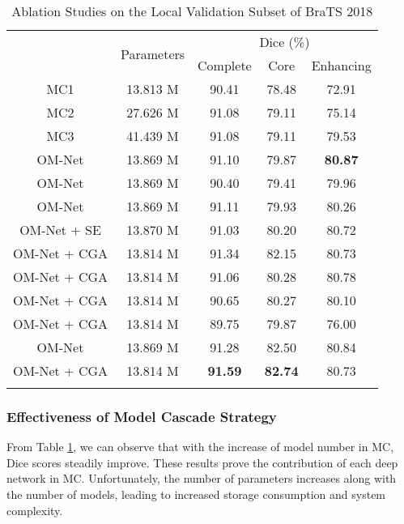 \documentclass[journal,twoside]{IEEEtran}
\begin{document}
\begin{table}[tp]
	\newcommand{\tabincell}[2]{\begin{tabular}{@{}#1@{}}#2\end{tabular}}	
	\fontsize{7}{14}\selectfont
	\centering
	\caption{Ablation Studies on the Local Validation Subset of BraTS 2018 }	
	\label{Table1}
	\begin{tabular}{c|c|c|c|c} 
		\shline
		\multirow{2}{*}{Method} & \multirow{2}{*}{Parameters} & \multicolumn{3}{c}{Dice (\%)} \\
		\cline{3-5}
		&  &Complete &Core &Enhancing  \\
		\hline 		
		MC1 &13.813 M  &90.41 &78.48 &72.91 \\
		\hline
		MC2 &27.626 M  &91.08 &79.11 &75.14 \\
		\hline
		MC3 &41.439 M  &91.08 &79.11 &79.53 \\
		\hline 
		\hline
		OM-Net &13.869 M  &91.10 &79.87 &\textbf{80.87} \\
		\hline		
		OM-Net &13.869 M  &90.40 &79.41 &79.96 \\
		\hline
		OM-Net &13.869 M  &91.11 &79.93 &80.26 \\	
		\hline
		\hline			
		OM-Net + SE & 13.870 M  &91.03 &80.20 &80.72 \\				
		\hline						
		OM-Net + CGA &13.814 M  &91.34 &82.15 &80.73 \\	
		\hline			
		OM-Net + CGA &13.814 M  &91.06 &80.28 &80.78 \\		
		\hline						
		OM-Net + CGA &13.814 M  &90.65 &80.27 &80.10 \\	
		\hline			
		OM-Net + CGA &13.814 M  &89.75 &79.87 &76.00\\			
		\hline
		\hline
		OM-Net &13.869 M  &91.28 &82.50 &80.84 \\	
		\hline	
		OM-Net + CGA & 13.814 M  &\textbf{91.59} &\textbf{82.74} &80.73 \\	
		\shline
	\end{tabular}
\end{table}  








\subsubsection{Effectiveness of Model Cascade Strategy}
From Table \ref{Table1}, we can observe that with the increase of model number in MC, Dice scores steadily improve. These results prove the contribution of each deep network in MC. Unfortunately, the number of parameters increases along with the number of models, leading to increased storage consumption and system complexity.
\end{document}
